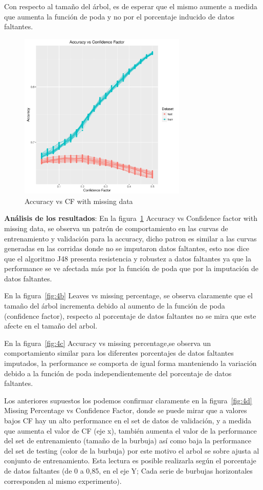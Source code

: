 Con respecto al tamaño del árbol, es de esperar que el mismo aumente
a medida que aumenta la función de poda y no por el porcentaje inducido de datos faltantes. 

\begin{figure}
  \centering
  \includegraphics[width = 8cm]{4a.pdf}
  \caption{Accuracy vs CF with missing data}
  \label{fig:4a}
\end{figure}

\textbf{Análisis de los resultados}: En la figura~\ref{fig:4a} Accuracy vs Confidence factor with missing data,
se observa un patrón de comportamiento en las curvas de entrenamiento y validación para la accuracy,
dicho patron es similar a las curvas generadas en las corridas donde no se imputaron datos faltantes,
esto nos dice que el algoritmo J48 presenta resistencia y robustez a datos faltantes 
ya que la performance se ve afectada más por la función de poda que por la imputación de datos faltantes.

En la figura~\ref{fig:4b} Leaves vs missing percentage, 
se observa claramente que el tamaño del árbol  incrementa debido al aumento de la función de poda 
(confidence factor), respecto al porcentaje de datos faltantes no se mira que este afecte en el tamaño del arbol.

En la figura~\ref{fig:4c} Accuracy vs missing percentage,se observa un comportamiento similar
para los diferentes porcentajes de datos faltantes imputados,  la performance se comporta de igual forma manteniendo
la variación debido a la función de poda independientemente del porcentaje de datos faltantes.

Los anteriores supuestos los podemos confirmar claramente en la figura~\ref{fig:4d} Missing Percentage vs Confidence Factor,
donde se puede mirar que a valores bajos CF hay un alto performance en el set de datos de validación, y a
medida que aumenta el valor de CF (eje x), también aumenta el valor de la performance del set de entrenamiento (tamaño
de la burbuja) así como baja la performance del set de testing (color de la burbuja) por este motivo el arbol se sobre ajusta
al conjunto de entrenamiento. 
Esta lectura es posible realizarla según el porcentaje de datos faltantes (de 0 a 0,85, en el eje Y; Cada serie de burbujas horizontales
corresponden al mismo experimento).

